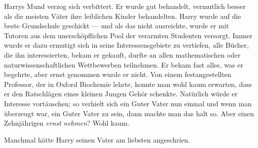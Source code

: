 Harrys Mund verzog sich verbittert. Er wurde gut behandelt, vermutlich besser als die meisten Väter ihre leiblichen Kinder behandelten. Harry wurde auf die beste Grundschule geschickt — und als das nicht ausreichte, wurde er mit Tutoren aus dem unerschöpflichen Pool der verarmten Studenten versorgt. Immer wurde er dazu ermutigt sich in seine Interessensgebiete zu vertiefen, alle Bücher, die ihn interessierten, bekam er gekauft, durfte an allen mathematischen oder naturwissenschaftlichen Wettbewerben teilnehmen. Er bekam fast alles, was er begehrte, aber ernst genommen wurde er nicht. Von einem festangestellten Professor, der in Oxford Biochemie lehrte, konnte man wohl kaum erwarten, dass er den Ratschlägen eines kleinen Jungen Gehör schenkte. Natürlich würde er Interesse vortäuschen; so verhielt sich ein Guter Vater nun einmal und wenn man überzeugt war, ein Guter Vater zu sein, dann machte man das halt so. Aber einen Zehnjährigen \emph{ernst nehmen}? Wohl kaum.

Manchmal hätte Harry seinen Vater am liebsten angeschrien.

